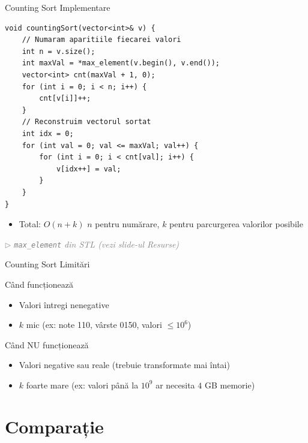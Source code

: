 ﻿\documentclass{beamer}
\newcommand{\beginnote}[1]{%
  \vfill
  {\footnotesize\textcolor{gray}{\textit{$\triangleright$ #1 (vezi slide-ul \emph{Resurse})}}}%
}
\begin{document}
\begin{frame}{Counting Sort \textemdash{} Implementare}
  \begin{lstlisting}
void countingSort(vector<int>& v) {
    // Numaram aparitiile fiecarei valori
    int n = v.size();
    int maxVal = *max_element(v.begin(), v.end());
    vector<int> cnt(maxVal + 1, 0);
    for (int i = 0; i < n; i++) {
        cnt[v[i]]++;
    }
    // Reconstruim vectorul sortat
    int idx = 0;
    for (int val = 0; val <= maxVal; val++) {
        for (int i = 0; i < cnt[val]; i++) {
            v[idx++] = val;
        }
    }
}
  \end{lstlisting}
  \begin{itemize}
    \item Total: $O(n + k)$ \textemdash{} $n$ pentru numărare, $k$ pentru parcurgerea valorilor posibile
  \end{itemize}
  \beginnote{\texttt{max\_element} \textemdash{} din STL}
\end{frame}

\begin{frame}{Counting Sort \textemdash{} Limitări}
  \begin{block}{Când funcționează}
    \begin{itemize}
      \item Valori întregi nenegative
      \item $k$ mic (ex: note 1\textendash{}10, vârste 0\textendash{}150, valori $\leq 10^6$)
    \end{itemize}
  \end{block}
  \begin{block}{Când NU funcționează}
    \begin{itemize}
      \item Valori negative sau reale (trebuie transformate mai întai)
      \item $k$ foarte mare (ex: valori până la $10^9$ \textemdash{} ar necesita $4$ GB memorie)
    \end{itemize}
  \end{block}
\end{frame}

\section{Comparație}
\end{document}
